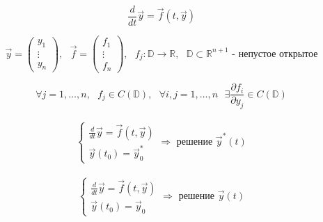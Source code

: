 \documentclass[12pt, a4paper]{report}
\begin{document}
\[
\displaystyle  \frac{d}{ dt } \vec{y }  = \vec{f }  (t, \vec{y }  ) 
\] 

\[ \vec{y }  =\begin{pmatrix}
y_1\\
\vdots\\
y_n
\end{pmatrix}, \text{ } \vec{f }  = \begin{pmatrix}
f_1     \\
\vdots\\
f_n
\end{pmatrix} , \text{ }  f_j : \mathbb{D} \to  \mathbb{R} ,\text{ }  \mathbb{D} \subset \mathbb{R}^{n+1 }  \text{ - непустое открытое} \] 

\[ \forall  j = 1, \ldots, n , \text{ }  f_j \in  C(\mathbb{D} ) , \text{ }  \forall  i,j = 1, \ldots, n \text{ }  \exists \frac{\partial  f_i }{\partial  y_j } \in  C(\mathbb{D})  \] 

\[ \begin{aligned}
    \begin{cases}
        \displaystyle \frac{d}{dt }  \vec{y } = \vec{f }  (t, \vec{y } ) \\
        \vec{y }  (t_0 ) = \vec{y }  ^{* }  _0
    \end{cases}
    \Rightarrow \text{ решение } \vec{y } ^* (t)  
\end{aligned} \] 

\[ \begin{aligned}
    \begin{cases}
        \displaystyle  \frac{d}{dt }  \vec{y }  = \vec{f }  (t, \vec{y}  )\\ 
        \vec{y } (t_0) = \vec{y }  _0
    \end{cases}
    \Rightarrow \text{ решение } \vec{y } (t)
\end{aligned} \]
\end{document}
